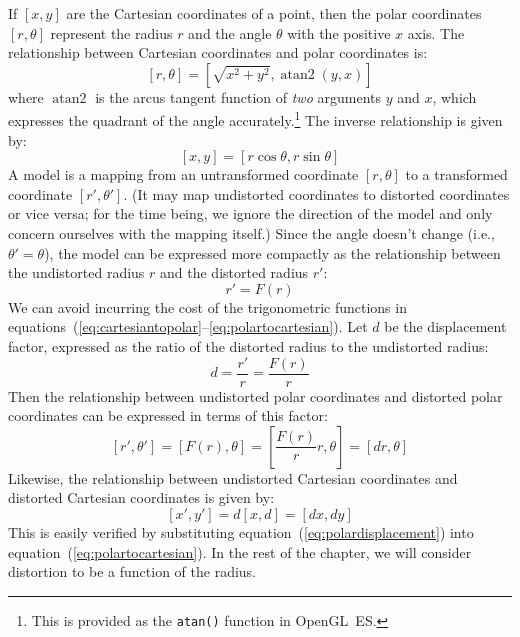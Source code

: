 \documentclass[english,12pt]{ifimaster}
\DeclareMathOperator{\atantwo}{atan2}
\begin{document}
If $[x, y]$ are the Cartesian coordinates of a point, then the polar
coordinates $[r, \theta]$ represent the radius $r$ and the angle
$\theta$ with the positive $x$ axis. The relationship between
Cartesian coordinates and polar coordinates is:
\begin{equation}
  \label{eq:cartesiantopolar}
  [r, \theta] = \left[\!\sqrt{x^2 + y^2}, \atantwo(y, x)\right]
\end{equation}
where $\atantwo$ is the arcus tangent function of \emph{two} arguments
$y$ and $x$, which expresses the quadrant of the angle
accurately.\footnote{This is provided as the \lstinline|atan()|
  function in OpenGL~ES.} The inverse relationship is given by:
\begin{equation}
  \label{eq:polartocartesian}
  [x, y] = [r\cos{\theta}, r\sin{\theta}]
\end{equation}
A model is a mapping from an untransformed coordinate $[r, \theta]$ to
a transformed coordinate $[r', \theta']$. (It may map undistorted
coordinates to distorted coordinates or vice versa; for the time
being, we ignore the direction of the model and only concern ourselves
with the mapping itself.) Since the angle doesn't change (i.e.,
$\theta' = \theta$), the model can be expressed more compactly as the
relationship between the undistorted radius $r$ and the distorted
radius $r'$:
\begin{equation}
  \label{eq:model}
  r' = F(r)
\end{equation}
We can avoid incurring the cost of the trigonometric functions in
equations~(\ref{eq:cartesiantopolar}--\ref{eq:polartocartesian}). Let
$d$ be the displacement factor, expressed as the ratio of the
distorted radius to the undistorted radius:
\begin{equation}
  \label{eq:displacement}
  d = \frac{r'}{r} = \frac{F(r)}{r}
\end{equation}
Then the relationship between undistorted polar coordinates and
distorted polar coordinates can be expressed in terms of this factor:
\begin{equation}
  \label{eq:polardisplacement}
  [r', \theta'] = [F(r), \theta] = \left[\frac{F(r)}{r}r, \theta\right] = [dr, \theta]
\end{equation}
Likewise, the relationship between undistorted Cartesian coordinates and
distorted Cartesian coordinates is given by:
\begin{equation}
  \label{eq:cartesiandisplacement}
  [x', y'] = d[x, d] = [dx, dy]
\end{equation}
This is easily verified by substituting
equation~(\ref{eq:polardisplacement}) into
equation~(\ref{eq:polartocartesian}). In the rest of the chapter, we
will consider distortion to be a function of the radius.
\end{document}
